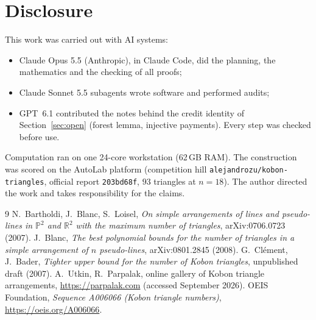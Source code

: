 \documentclass[11pt]{article}
\theoremstyle{definition}
\theoremstyle{remark}
\begin{document}
\section{Disclosure}\label{sec:disclosure}
This work was carried out with AI systems:
\begin{itemize}[nosep]
\item Claude Opus 5.5 (Anthropic), in Claude Code, did the planning, the mathematics and the checking of all proofs;
\item Claude Sonnet 5.5 subagents wrote software and performed audits;
\item GPT~6.1 contributed the notes behind the credit identity of Section~\ref{sec:open} (forest lemma, injective
payments). Every step was checked before use.
\end{itemize}
Computation ran on one 24-core workstation (62\,GB RAM). The construction was scored on the AutoLab platform
(competition hill \texttt{alejandrozu/kobon-triangles}, official report \texttt{203bd68f}, $93$ triangles at $n=18$).
The author directed the work and takes responsibility for the claims.

\begin{thebibliography}{9}
 N.~Bartholdi, J.~Blanc, S.~Loisel, \emph{On simple arrangements of lines and pseudo-lines in
$\mathbb P^2$ and $\mathbb R^2$ with the maximum number of triangles}, arXiv:0706.0723 (2007).
 J.~Blanc, \emph{The best polynomial bounds for the number of triangles in a simple arrangement of $n$
pseudo-lines}, arXiv:0801.2845 (2008).
 G.~Clément, J.~Bader, \emph{Tighter upper bound for the number of Kobon triangles}, unpublished
draft (2007).
 A.~Utkin, R.~Parpalak, online gallery of Kobon triangle arrangements, \url{https://parpalak.com}
(accessed September 2026).
 OEIS Foundation, \emph{Sequence A006066 (Kobon triangle numbers)}, \url{https://oeis.org/A006066}.
\end{thebibliography}
\end{document}
